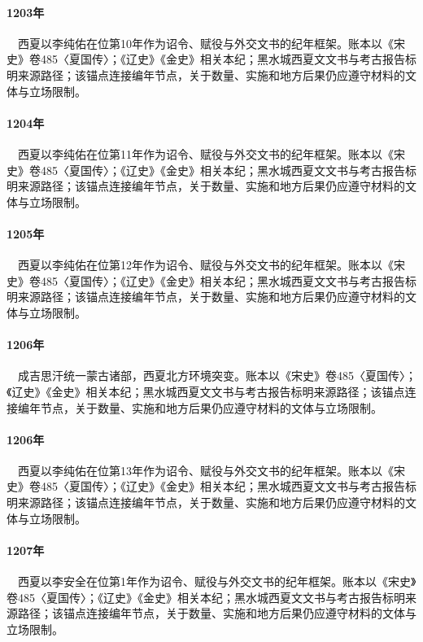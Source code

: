 \paragraph{1203年}　西夏以李纯佑在位第10年作为诏令、赋役与外交文书的纪年框架。账本以《宋史》卷485〈夏国传〉；《辽史》《金史》相关本纪；黑水城西夏文文书与考古报告标明来源路径；该锚点连接编年节点，关于数量、实施和地方后果仍应遵守材料的文体与立场限制。

\paragraph{1204年}　西夏以李纯佑在位第11年作为诏令、赋役与外交文书的纪年框架。账本以《宋史》卷485〈夏国传〉；《辽史》《金史》相关本纪；黑水城西夏文文书与考古报告标明来源路径；该锚点连接编年节点，关于数量、实施和地方后果仍应遵守材料的文体与立场限制。

\paragraph{1205年}　西夏以李纯佑在位第12年作为诏令、赋役与外交文书的纪年框架。账本以《宋史》卷485〈夏国传〉；《辽史》《金史》相关本纪；黑水城西夏文文书与考古报告标明来源路径；该锚点连接编年节点，关于数量、实施和地方后果仍应遵守材料的文体与立场限制。

\paragraph{1206年}　成吉思汗统一蒙古诸部，西夏北方环境突变。账本以《宋史》卷485〈夏国传〉；《辽史》《金史》相关本纪；黑水城西夏文文书与考古报告标明来源路径；该锚点连接编年节点，关于数量、实施和地方后果仍应遵守材料的文体与立场限制。

\paragraph{1206年}　西夏以李纯佑在位第13年作为诏令、赋役与外交文书的纪年框架。账本以《宋史》卷485〈夏国传〉；《辽史》《金史》相关本纪；黑水城西夏文文书与考古报告标明来源路径；该锚点连接编年节点，关于数量、实施和地方后果仍应遵守材料的文体与立场限制。

\paragraph{1207年}　西夏以李安全在位第1年作为诏令、赋役与外交文书的纪年框架。账本以《宋史》卷485〈夏国传〉；《辽史》《金史》相关本纪；黑水城西夏文文书与考古报告标明来源路径；该锚点连接编年节点，关于数量、实施和地方后果仍应遵守材料的文体与立场限制。

